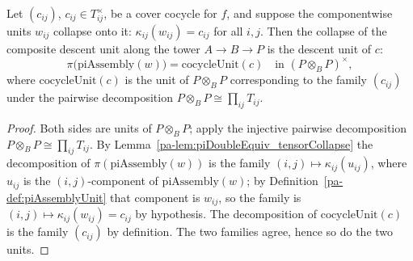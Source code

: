 \begin{theorem}
  \label{pa-thm:tensorCollapse_piAssemblyUnit}
  \leanok

  Let \((c_{ij})\), \(c_{ij} \in T_{ij}^{\times}\), be a cover cocycle for \(f\), and suppose
  the componentwise units \(w_{ij}\) collapse onto it: \(\kappa_{ij}(w_{ij}) = c_{ij}\) for
  all \(i, j\). Then the collapse of the composite descent unit along the tower
  \(A \to B \to P\) is the descent unit of \(c\):
  \[
    \pi\bigl(\mathrm{piAssembly}(w)\bigr) = \mathrm{cocycleUnit}(c)
    \quad\text{in } (P \otimes_B P)^{\times},
  \]
  where \(\mathrm{cocycleUnit}(c)\) is the unit of \(P \otimes_B P\) corresponding to the
  family \((c_{ij})\) under the pairwise decomposition
  \(P \otimes_B P \cong \prod_{ij} T_{ij}\).
\end{theorem}
\begin{proof}
  \leanok
  Both sides are units of \(P \otimes_B P\); apply the injective pairwise decomposition
  \(P \otimes_B P \cong \prod_{ij} T_{ij}\). By Lemma~\ref{pa-lem:piDoubleEquiv_tensorCollapse}
  the decomposition of \(\pi(\mathrm{piAssembly}(w))\) is the family
  \((i,j) \mapsto \kappa_{ij}(u_{ij})\), where \(u_{ij}\) is the \((i,j)\)-component of
  \(\mathrm{piAssembly}(w)\); by Definition~\ref{pa-def:piAssemblyUnit} that component is
  \(w_{ij}\), so the family is \((i,j) \mapsto \kappa_{ij}(w_{ij}) = c_{ij}\) by hypothesis.
  The decomposition of \(\mathrm{cocycleUnit}(c)\) is the family \((c_{ij})\) by definition.
  The two families agree, hence so do the two units.
\end{proof}

